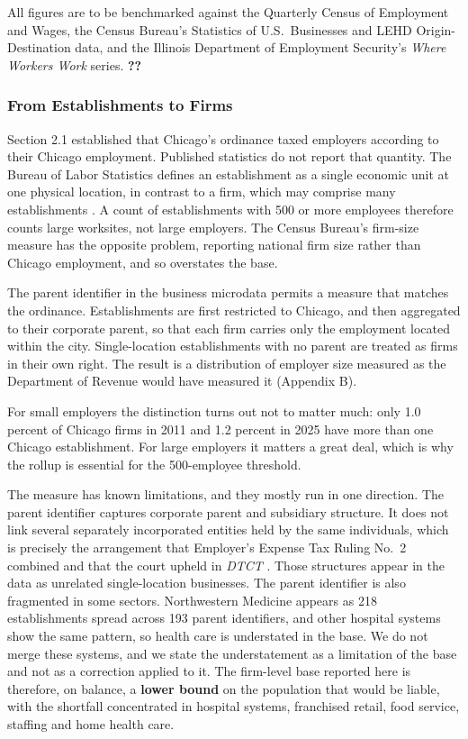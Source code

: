 \documentclass[12pt,letterpaper]{article}
\newif\ifdraft
\newcommand{\PEND}[1]{\ifdraft\textcolor{red}{[#1]}\else\textbf{??}\fi}
\begin{document}
All figures are to be benchmarked against the Quarterly Census of Employment and Wages, the Census Bureau's Statistics of U.S.\ Businesses and LEHD Origin-Destination data, and the Illinois Department of Employment Security's \textit{Where Workers Work} series. \PEND{report the benchmark comparison}

\subsubsection{From Establishments to Firms}

Section 2.1 established that Chicago's ordinance taxed employers according to their Chicago employment. Published statistics do not report that quantity. The Bureau of Labor Statistics defines an establishment as a single economic unit at one physical location, in contrast to a firm, which may comprise many establishments \citep{bls2025}. A count of establishments with 500 or more employees therefore counts large worksites, not large employers. The Census Bureau's firm-size measure has the opposite problem, reporting national firm size rather than Chicago employment, and so overstates the base.

The parent identifier in the business microdata permits a measure that matches the ordinance. Establishments are first restricted to Chicago, and then aggregated to their corporate parent, so that each firm carries only the employment located within the city. Single-location establishments with no parent are treated as firms in their own right. The result is a distribution of employer size measured as the Department of Revenue would have measured it (Appendix B).

For small employers the distinction turns out not to matter much: only 1.0 percent of Chicago firms in 2011 and 1.2 percent in 2025 have more than one Chicago establishment. For large employers it matters a great deal, which is why the rollup is essential for the 500-employee threshold.

The measure has known limitations, and they mostly run in one direction. The parent identifier captures corporate parent and subsidiary structure. It does not link several separately incorporated entities held by the same individuals, which is precisely the arrangement that Employer's Expense Tax Ruling No.~2 combined and that the court upheld in \textit{DTCT} \citep{dtct2011}. Those structures appear in the data as unrelated single-location businesses. The parent identifier is also fragmented in some sectors. Northwestern Medicine appears as 218 establishments spread across 193 parent identifiers, and other hospital systems show the same pattern, so health care is understated in the base. We do not merge these systems, and we state the understatement as a limitation of the base and not as a correction applied to it. The firm-level base reported here is therefore, on balance, a \textbf{lower bound} on the population that would be liable, with the shortfall concentrated in hospital systems, franchised retail, food service, staffing and home health care.
\end{document}
